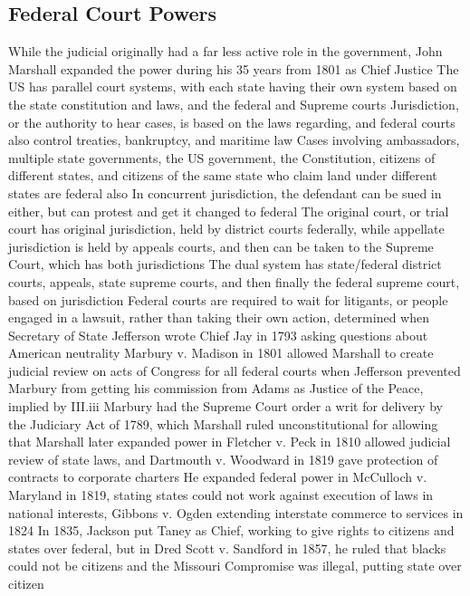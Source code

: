 \documentclass[11 pt, twoside]{article}
\newenvironment{outline*}
{
	\begin{outline}[enumerate]
	}
	{\end{outline}
}
\begin{document}
\subsection{Federal Court Powers}
\begin{outline*}
\1 While the judicial originally had a far less active role in the government, John Marshall expanded the power during his 35 years from 1801 as Chief Justice
\1 The US has parallel court systems, with each state having their own system based on the state constitution and laws, and the federal and Supreme courts
\1 Jurisdiction, or the authority to hear cases, is based on the laws regarding, and federal courts also control treaties, bankruptcy, and maritime law
\2 Cases involving ambassadors, multiple state governments, the US government, the Constitution, citizens of different states, and citizens of the same state who claim land under different states are federal also
\2 In concurrent jurisdiction, the defendant can be sued in either, but can protest and get it changed to federal
\2 The original court, or trial court has original jurisdiction, held by district courts federally, while appellate jurisdiction is held by appeals courts, and then can be taken to the Supreme Court, which has both jurisdictions
\2 The dual system has state/federal district courts, appeals, state supreme courts, and then finally the federal supreme court, based on jurisdiction
\1 Federal courts are required to wait for litigants, or people engaged in a lawsuit, rather than taking their own action, determined when Secretary of State Jefferson wrote Chief Jay in 1793 asking questions about American neutrality
\1 Marbury v. Madison in 1801 allowed Marshall to create judicial review on acts of Congress for all federal courts when Jefferson prevented Marbury from getting his commission from Adams as Justice of the Peace, implied by III.iii
\2 Marbury had the Supreme Court order a writ for delivery by the Judiciary Act of 1789, which Marshall ruled unconstitutional for allowing that
\1 Marshall later expanded power in Fletcher v. Peck in 1810 allowed judicial review of state laws, and Dartmouth v. Woodward in 1819 gave protection of contracts to corporate charters
\2 He expanded federal power in McCulloch v. Maryland in 1819, stating states could not work against execution of laws in national interests, Gibbons v. Ogden extending interstate commerce to services in 1824
\1 In 1835, Jackson put Taney as Chief, working to give rights to citizens and states over federal, but in Dred Scott v. Sandford in 1857, he ruled that blacks could not be citizens and the Missouri Compromise was illegal, putting state over citizen

\end{outline*}
\end{document}
